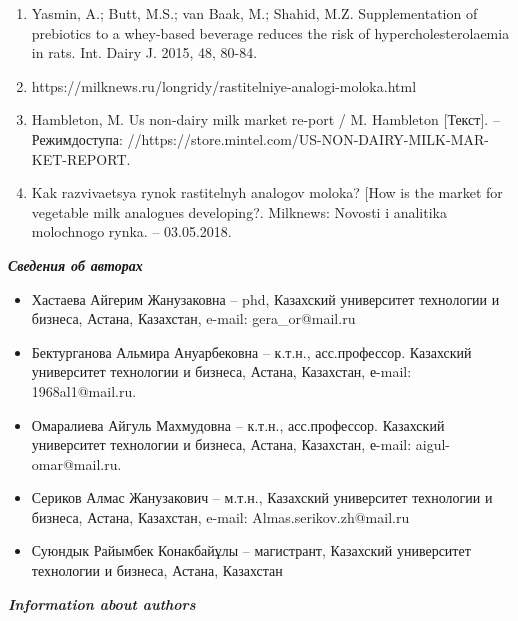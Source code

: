 \begin{enumerate}
\item
Yasmin, A.; Butt, M.S.; van Baak, M.; Shahid, M.Z. Supplementation of
prebiotics to a whey-based beverage reduces the risk of
hypercholesterolaemia in rats. Int. Dairy J. 2015, 48, 80-84.

\item
https://milknews.ru/longridy/rastitelniye-analogi-moloka.html

\item
Hambleton, M. Us non-dairy milk market re-port / M. Hambleton
{[}Текст{]}. -- Режимдоступа:
//https://store.mintel.com/US-NON-DAIRY-MILK-MAR-KET-REPORT.

\item
Kak razvivaetsya rynok rastitel\textquotesingle nyh analogov moloka?
{[}How is the market for vegetable milk analogues developing?. Milknews:
Novosti i analitika molochnogo rynka. -- 03.05.2018.
\end{enumerate}

\begin{center}
\emph{{\bfseries Сведения об авторах}}
\end{center}

\begin{itemize}
\item
Хастаева Айгерим Жанузаковна -- phd, Казахский университет технологии и
бизнеса, Астана, Казахстан, e-mail: gera\_or@mail.ru

\item
Бектурганова Альмира Ануарбековна -- к.т.н., асс.профессор. Казахский
университет технологии и бизнеса, Астана, Казахстан, е-mail:
1968al1@mail.ru.

\item
Омаралиева Айгуль Махмудовна -- к.т.н., асс.профессор. Казахский
университет технологии и бизнеса, Астана, Казахстан, е-mail:
aigul-omar@mail.ru.

\item
Сериков Алмас Жанузакович -- м.т.н., Казахский университет технологии и
бизнеса, Астана, Казахстан, e-mail: Almas.serikov.zh@mail.ru

\item
Суюндык Райымбек Конакбайұлы -- магистрант, Казахский университет
технологии и бизнеса, Астана, Казахстан
\end{itemize}

\begin{center}
\emph{{\bfseries Information about authors}}
\end{center}

